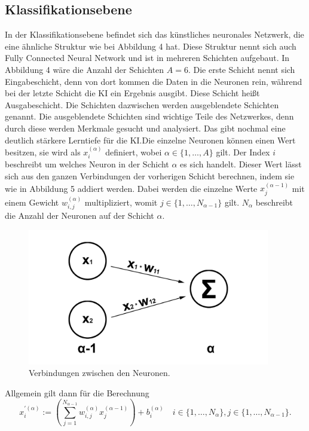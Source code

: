 \documentclass[11pt]{article}
\begin{document}
\subsection{Klassifikationsebene}
In der Klassifikationsebene befindet sich das künstliches neuronales Netzwerk, die eine ähnliche Struktur wie bei Abbildung 4 hat.
Diese Struktur nennt sich auch Fully Connected Neural Network und ist in mehreren Schichten aufgebaut. In Abbildung 4 wäre die Anzahl
der Schichten $A = 6$. Die erste Schicht nennt sich Eingabeschicht, denn von dort kommen die Daten in die Neuronen rein, während bei
der letzte Schicht die KI ein Ergebnis ausgibt. Diese Schicht heißt Ausgabeschicht. Die Schichten dazwischen werden ausgeblendete Schichten genannt.
Die ausgeblendete Schichten sind wichtige Teile des Netzwerkes, denn durch diese werden Merkmale gesucht und analysiert. Das gibt nochmal
eine deutlich stärkere Lerntiefe für die KI.\@ Die einzelne Neuronen können einen Wert besitzen, sie wird als $ x_{i}^{(\alpha)} $ definiert,
wobei $ \alpha \in \{1,\ldots,A\} $ gilt. Der Index $i$ beschreibt um welches Neuron in der Schicht $\alpha$ es sich handelt. Dieser Wert
lässt sich aus den ganzen Verbindungen der vorherigen Schicht berechnen, indem sie wie in Abbildung 5 addiert werden. Dabei werden
die einzelne Werte $ x_{j}^{(\alpha-1)} $ mit einem Gewicht $ w_{i,j}^{(\alpha)} $ multipliziert, womit $ j \in \{1,\ldots,N_{\alpha-1}\} $ gilt.
$ N_{\alpha} $ beschreibt die Anzahl der Neuronen auf der Schicht $\alpha$.
\begin{figure}[h]
    \centering
    \includegraphics[width=300pt, keepaspectratio]{images/verbindung}
    \caption{Verbindungen zwischen den Neuronen.}
\end{figure}
Allgemein gilt dann für die Berechnung
\begin{equation}
    x_{i}^{'(\alpha)} := (\sum_{j=1}^{N_{\alpha-1}} w_{i,j}^{(\alpha)} x_{j}^{(\alpha-1)}) + b_{i}^{(\alpha)} \quad i \in \{1,\ldots,N_{\alpha}\}, j \in \{1,\ldots,N_{\alpha-1}\}.
\end{equation}
\end{document}
